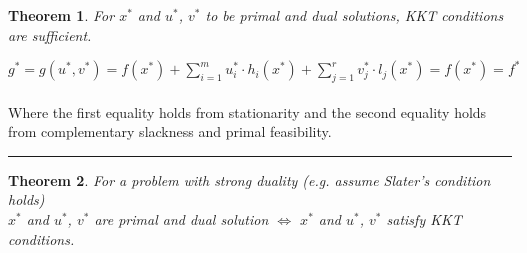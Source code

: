 \documentclass[twoside]{article}
\newcounter{lecnum}
\newtheorem{theorem}{Theorem}[lecnum]
\newenvironment{proof}{{\bf Proof:}}{\hfill\rule{2mm}{2mm}}
\begin{document}
\begin{theorem}
For $x^{*}$ and $u^{*}$, $v^{*}$ to be primal and dual solutions, KKT conditions are sufficient. 
\end{theorem}

\begin{proof}
$g^* = g(u^{*},v^{*}) = f(x^{*}) +  \sum_{i=1}^{m} u_i^{*} \cdot h_i(x^{*}) + \sum_{j=1}^{r} v_j^{*} \cdot l_j(x^{*})  = f(x^{*}) = f^* $ \\
\\ Where the first equality holds from stationarity and the second equality holds from complementary slackness and primal feasibility.
\end{proof}

\newpage 

\begin{theorem}
For a problem with strong duality (e.g. assume Slater's condition holds)\\
 $x^{*}$ and $u^{*}$, $v^{*}$ are primal and dual solution $\iff$ $x^{*}$ and $u^{*}$, $v^{*}$ satisfy KKT conditions.
\end{theorem}
\end{document}
